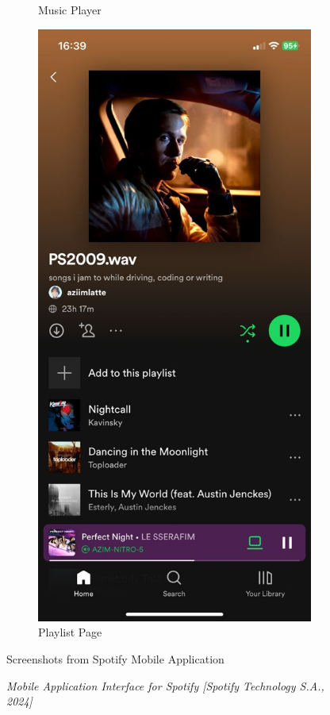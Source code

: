 \begin{figure} [h]
\begin{subfigure}{.3\linewidth}
      \caption{Music Player}
      \label{fig:myfig18}
    \end{subfigure}%
    \hspace{1em}%
    \begin{subfigure}{.3\linewidth}
      \centering
      \includegraphics[width = \linewidth]{mainmatter/images/spotify3.jpg}
      \caption{Playlist Page}
      \label{fig:myfig19}
    \end{subfigure}
    \caption{Screenshots from Spotify Mobile Application}
    \caption*{\textit{Mobile Application Interface for Spotify [Spotify Technology S.A., 2024]}}
\end{figure}

